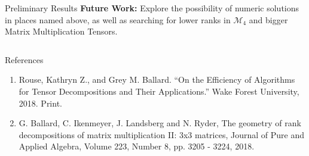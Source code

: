 \documentclass[final,hyperref={pdfpagelabels=false}]{beamer}
\begin{document}
\begin{frame}[t]
\begin{columns}[t]
\begin{column}{.5\linewidth}
\begin{block}{Preliminary Results}
        \newline\textbf{Future Work:}
        Explore the possibility of numeric solutions in places named above, as well as searching for lower ranks in $\mathcal{M}_4$ and bigger Matrix Multiplication Tensors.
        \end{block}
    \end{column}
\end{columns}
\begin{block}{References}
            \begin{enumerate}
                \item Rouse, Kathryn Z., and Grey M. Ballard. “On the Efficiency of Algorithms for Tensor Decompositions and Their Applications.” Wake Forest University, 2018. Print.
                \item G. Ballard, C. Ikenmeyer, J. Landsberg and N. Ryder, The geometry of rank decompositions of matrix multiplication II: 3x3 matrices, Journal of Pure and Applied Algebra, Volume 223, Number 8, pp. 3205 - 3224, 2018.
            \end{enumerate}
        \end{block}
\end{frame}
\end{document}

